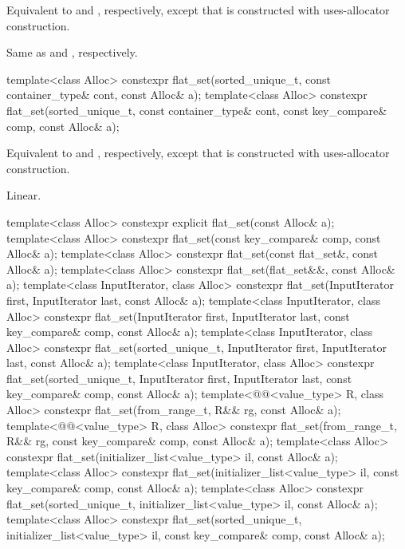 \begin{itemdescr}
\pnum
\effects
Equivalent to
 and , respectively,
except that  is constructed with
uses-allocator construction.

\pnum
\complexity
Same as  and , respectively.
\end{itemdescr}

%
\begin{itemdecl}
template<class Alloc>
  constexpr flat_set(sorted_unique_t, const container_type& cont, const Alloc& a);
template<class Alloc>
  constexpr flat_set(sorted_unique_t, const container_type& cont,
                     const key_compare& comp, const Alloc& a);
\end{itemdecl}

\begin{itemdescr}
\pnum
\effects
Equivalent to
 and
, respectively,
except that  is constructed with
uses-allocator construction.

\pnum
\complexity
Linear.
\end{itemdescr}

%
\begin{itemdecl}
template<class Alloc>
  constexpr explicit flat_set(const Alloc& a);
template<class Alloc>
  constexpr flat_set(const key_compare& comp, const Alloc& a);
template<class Alloc>
  constexpr flat_set(const flat_set&, const Alloc& a);
template<class Alloc>
  constexpr flat_set(flat_set&&, const Alloc& a);
template<class InputIterator, class Alloc>
  constexpr flat_set(InputIterator first, InputIterator last, const Alloc& a);
template<class InputIterator, class Alloc>
  constexpr flat_set(InputIterator first, InputIterator last, const key_compare& comp,
                     const Alloc& a);
template<class InputIterator, class Alloc>
  constexpr flat_set(sorted_unique_t, InputIterator first, InputIterator last, const Alloc& a);
template<class InputIterator, class Alloc>
  constexpr flat_set(sorted_unique_t, InputIterator first, InputIterator last,
                     const key_compare& comp, const Alloc& a);
template<@@<value_type> R, class Alloc>
  constexpr flat_set(from_range_t, R&& rg, const Alloc& a);
template<@@<value_type> R, class Alloc>
  constexpr flat_set(from_range_t, R&& rg, const key_compare& comp, const Alloc& a);
template<class Alloc>
  constexpr flat_set(initializer_list<value_type> il, const Alloc& a);
template<class Alloc>
  constexpr flat_set(initializer_list<value_type> il, const key_compare& comp, const Alloc& a);
template<class Alloc>
  constexpr flat_set(sorted_unique_t, initializer_list<value_type> il, const Alloc& a);
template<class Alloc>
  constexpr flat_set(sorted_unique_t, initializer_list<value_type> il,
                     const key_compare& comp, const Alloc& a);
\end{itemdecl}

